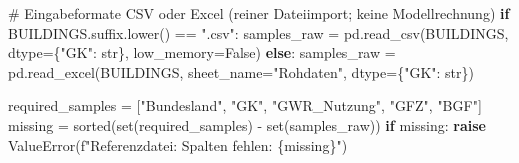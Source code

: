 \documentclass[
  ngerman,
  a4paper,
  DIV=11]{scrreprt}
\newenvironment{Shaded}{\begin{snugshade}}{\end{snugshade}}
\newcommand{\BuiltInTok}[1]{\textcolor[rgb]{0.00,0.23,0.31}{#1}}
\newcommand{\CommentTok}[1]{\textcolor[rgb]{0.37,0.37,0.37}{#1}}
\newcommand{\ControlFlowTok}[1]{\textcolor[rgb]{0.00,0.23,0.31}{\textbf{#1}}}
\newcommand{\NormalTok}[1]{\textcolor[rgb]{0.00,0.23,0.31}{#1}}
\newcommand{\OperatorTok}[1]{\textcolor[rgb]{0.37,0.37,0.37}{#1}}
\newcommand{\PreprocessorTok}[1]{\textcolor[rgb]{0.68,0.00,0.00}{#1}}
\newcommand{\SpecialCharTok}[1]{\textcolor[rgb]{0.37,0.37,0.37}{#1}}
\newcommand{\SpecialStringTok}[1]{\textcolor[rgb]{0.13,0.47,0.30}{#1}}
\newcommand{\StringTok}[1]{\textcolor[rgb]{0.13,0.47,0.30}{#1}}
\newcommand{\VariableTok}[1]{\textcolor[rgb]{0.07,0.07,0.07}{#1}}
\begin{document}
\begin{Shaded}
\begin{Highlighting}[]
\CommentTok{\# Eingabeformate CSV oder Excel (reiner Dateiimport; keine Modellrechnung)}
\ControlFlowTok{if}\NormalTok{ BUILDINGS.suffix.lower() }\OperatorTok{==} \StringTok{".csv"}\NormalTok{:}
\NormalTok{    samples\_raw }\OperatorTok{=}\NormalTok{ pd.read\_csv(BUILDINGS, dtype}\OperatorTok{=}\NormalTok{\{}\StringTok{"GK"}\NormalTok{: }\BuiltInTok{str}\NormalTok{\}, low\_memory}\OperatorTok{=}\VariableTok{False}\NormalTok{)}
\ControlFlowTok{else}\NormalTok{:}
\NormalTok{    samples\_raw }\OperatorTok{=}\NormalTok{ pd.read\_excel(BUILDINGS, sheet\_name}\OperatorTok{=}\StringTok{"Rohdaten"}\NormalTok{, dtype}\OperatorTok{=}\NormalTok{\{}\StringTok{"GK"}\NormalTok{: }\BuiltInTok{str}\NormalTok{\})}

\NormalTok{required\_samples }\OperatorTok{=}\NormalTok{ [}\StringTok{"Bundesland"}\NormalTok{, }\StringTok{"GK"}\NormalTok{, }\StringTok{"GWR\_Nutzung"}\NormalTok{, }\StringTok{"GFZ"}\NormalTok{, }\StringTok{"BGF"}\NormalTok{]}
\NormalTok{missing }\OperatorTok{=} \BuiltInTok{sorted}\NormalTok{(}\BuiltInTok{set}\NormalTok{(required\_samples) }\OperatorTok{{-}} \BuiltInTok{set}\NormalTok{(samples\_raw))}
\ControlFlowTok{if}\NormalTok{ missing:}
    \ControlFlowTok{raise} \PreprocessorTok{ValueError}\NormalTok{(}\SpecialStringTok{f"Referenzdatei: Spalten fehlen: }\SpecialCharTok{\{}\NormalTok{missing}\SpecialCharTok{\}}\SpecialStringTok{"}\NormalTok{)}


\end{Highlighting}
\end{Shaded}
\end{document}
